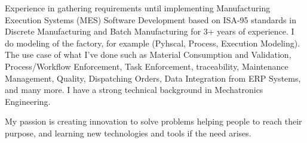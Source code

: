 

\begin{cvparagraph}

Experience in gathering requirements until implementing Manufacturing Execution Systems (MES) Software Development based on ISA-95 standards in Discrete Manufacturing and Batch Manufacturing for 3+ years of experience. I do modeling of the factory, for example (Pyhscal, Process, Execution Modeling). The use case of what I've done such as Material Consumption and Validation, Process/Workflow Enforcement, Task Enforcement, traceability, Maintenance Management, Quality, Dispatching Orders, Data Integration from ERP Systems, and many more. I have a strong technical background in Mechatronics Engineering.

My passion is creating innovation to solve problems helping people to reach their purpose, and learning new technologies and tools if the need arises.
\end{cvparagraph}
